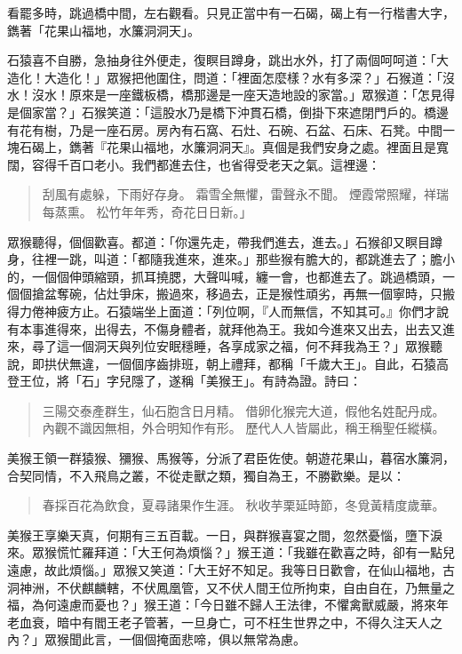 看罷多時，跳過橋中間，左右觀看。只見正當中有一石碣，碣上有一行楷書大字，鐫著「花果山福地，水簾洞洞天」。

石猿喜不自勝，急抽身往外便走，復瞑目蹲身，跳出水外，打了兩個呵呵道：「大造化！大造化！」眾猴把他圍住，問道：「裡面怎麼樣？水有多深？」石猴道：「沒水！沒水！原來是一座鐵板橋，橋那邊是一座天造地設的家當。」眾猴道：「怎見得是個家當？」石猴笑道：「這股水乃是橋下沖貫石橋，倒掛下來遮閉門戶的。橋邊有花有樹，乃是一座石房。房內有石窩、石灶、石碗、石盆、石床、石凳。中間一塊石碣上，鐫著『花果山福地，水簾洞洞天』。真個是我們安身之處。裡面且是寬闊，容得千百口老小。我們都進去住，也省得受老天之氣。這裡邊：
\begin{quote}
刮風有處躲，下雨好存身。
霜雪全無懼，雷聲永不聞。
煙霞常照耀，祥瑞每蒸熏。
松竹年年秀，奇花日日新。」
\end{quote}

眾猴聽得，個個歡喜。都道：「你還先走，帶我們進去，進去。」石猴卻又瞑目蹲身，往裡一跳，叫道：「都隨我進來，進來。」那些猴有膽大的，都跳進去了；膽小的，一個個伸頭縮頸，抓耳撓腮，大聲叫喊，纏一會，也都進去了。跳過橋頭，一個個搶盆奪碗，佔灶爭床，搬過來，移過去，正是猴性頑劣，再無一個寧時，只搬得力倦神疲方止。石猿端坐上面道：「列位啊，『人而無信，不知其可。』你們才說有本事進得來，出得去，不傷身體者，就拜他為王。我如今進來又出去，出去又進來，尋了這一個洞天與列位安眠穩睡，各享成家之福，何不拜我為王？」眾猴聽說，即拱伏無違，一個個序齒排班，朝上禮拜，都稱「千歲大王」。自此，石猿高登王位，將「石」字兒隱了，遂稱「美猴王」。有詩為證。詩曰：
\begin{quote}
三陽交泰產群生，仙石胞含日月精。
借卵化猴完大道，假他名姓配丹成。
內觀不識因無相，外合明知作有形。
歷代人人皆屬此，稱王稱聖任縱橫。
\end{quote}

美猴王領一群猿猴、獼猴、馬猴等，分派了君臣佐使。朝遊花果山，暮宿水簾洞，合契同情，不入飛鳥之叢，不從走獸之類，獨自為王，不勝歡樂。是以：
\begin{quote}
春採百花為飲食，夏尋諸果作生涯。
秋收芋栗延時節，冬覓黃精度歲華。
\end{quote}

美猴王享樂天真，何期有三五百載。一日，與群猴喜宴之間，忽然憂惱，墮下淚來。眾猴慌忙羅拜道：「大王何為煩惱？」猴王道：「我雖在歡喜之時，卻有一點兒遠慮，故此煩惱。」眾猴又笑道：「大王好不知足。我等日日歡會，在仙山福地，古洞神洲，不伏麒麟轄，不伏鳳凰管，又不伏人間王位所拘束，自由自在，乃無量之福，為何遠慮而憂也？」猴王道：「今日雖不歸人王法律，不懼禽獸威嚴，將來年老血衰，暗中有閻王老子管著，一旦身亡，可不枉生世界之中，不得久注天人之內？」眾猴聞此言，一個個掩面悲啼，俱以無常為慮。


